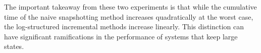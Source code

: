 The important takeaway from these two experiments is that while the cumulative time of the naive snapshotting method increases quadratically at the worst case, the log-structured incremental methods increase linearly. This distinction can have significant ramifications in the performance of systems that keep large states.


